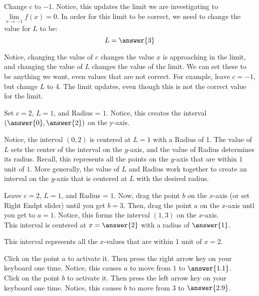 \documentclass{ximera}
\begin{document}
\begin{exercise}
    \begin{question}
   	  Change $ c $ to $-1$.  Notice, this updates the limit we are investigating to $\lim\limits_{x \to -1}f(x)=0$.  In order for this limit to be correct, we need to change the value for $ L $ to be: 
   	  \[
   	      L=\answer{3}
   	  \]
   	  \begin{feedback}
   	  	Notice, changing the value of $ c $ changes the value $x$ is approaching in the limit, and changing the value of $L$ changes the value of the limit.  We can set these to be anything we want, even values that are not correct.  For example, leave $ c=-1 $, but change $ L $ to 4.  The limit updates, even though this is not the correct value for the limit.
   	  \end{feedback}
      \begin{question}
      	Set $c = 2$, $L = 1$, and Radius = $1$.  Notice, this creates the interval $\left(\answer{0}, \answer{2}\right)$ on the y-axis.
      	\begin{feedback}
      		Notice, the interval $(0,2)$ is centered at $L=1$ with a Radius of 1.  The value of $ L $ sets the center of the interval on the $y$-axis, and the value of Radius determines its radius.  Recall, this represents all the points on the $y$-axis that are within $1$ unit of $1$.  More generally, the value of $ L $ and Radius work together to create an interval on the $y$-axis that is centered at $ L $ with the desired radius.
      	\end{feedback}
        \begin{question}
        	Leave $c=2$, $L = 1$, and Radius = $1$.  Now, drag the point $b$ on the $x$-axis (or set Right Endpt slider) until you get $b=3$.  Then, drag the point $a$ on the $x$-axis untl you get to $a=1$.  Notice, this forms the interval $(1,3)$ on the $x$-axis. \\
        	This interval is centered at $x=\answer{2}$ with a radius of $\answer{1}$.
        	\begin{feedback}
        		This interval represents all the $x$-values that are within 1 unit of $x=2$.
        	\end{feedback}
        	\begin{question}
        		Click on the point $a$ to activate it.  Then press the right arrow key on your keyboard one time.  Notice, this causes $a$ to move from $1$ to $\answer{1.1}$.\\
        		Click on the point $b$ to activate it.  Then press the left arrow key on your keyboard one time.  Notice, this causes $b$ to move from $3$ to $\answer{2.9}$.\\

\end{question}
\end{question}
\end{question}
\end{question}
\end{exercise}
\end{document}
